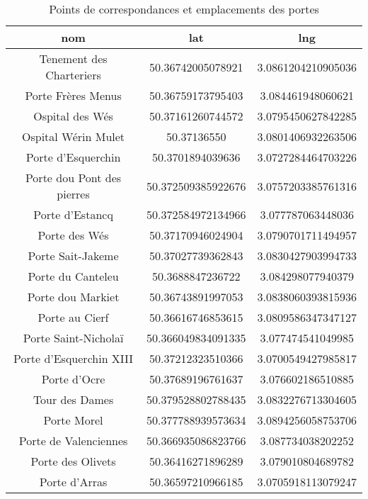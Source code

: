 \small
\begin{table}
    \centering
    \begin{tabular}{|c|c|c|}
\hline	\textbf{nom}	&	\textbf{lat}	&	\textbf{lng}	\\
\hline
\hline	Tenement des Charteriers 	&	50.36742005078921	&	3.0861204210905036	\\
\hline	Porte Frères Menus 	&	50.36759173795403	&	3.084461948060621	\\
\hline	Ospital des Wés 	&	50.37161260744572	&	3.0795450627842285	\\
\hline	Ospital Wérin Mulet 	&	50.37136550	&	3.0801406932263506	\\
\hline	Porte d'Esquerchin	&	50.3701894039636	&	3.0727284464703226	\\
\hline	Porte dou Pont des pierres	&	50.372509385922676	&	3.0757203385761316	\\
\hline	Porte d'Estancq	&	50.372584972134966	&	3.077787063448036	\\
\hline	Porte des Wés	&	50.37170946024904	&	3.0790701711494957	\\
\hline	Porte Sait-Jakeme	&	50.37027739362843	&	3.0830427903994733	\\
\hline	Porte du Canteleu	&	50.3688847236722	&	3.084298077940379	\\
\hline	Porte dou Markiet	&	50.36743891997053	&	3.0838060393815936	\\
\hline	Porte au Cierf	&	50.36616746853615	&	3.0809586347347127	\\
\hline	Porte Saint-Nicholaï	&	50.366049834091335	&	3.077474541049985	\\
\hline	Porte d'Esquerchin XIII	&	50.37212323510366	&	3.0700549427985817	\\
\hline	Porte d'Ocre	&	50.37689196761637	&	3.076602186510885	\\
\hline	Tour des Dames	&	50.379528802788435	&	3.0832276713304605	\\
\hline	Porte Morel	&	50.377788939573634	&	3.0894256058753706	\\
\hline	Porte de Valenciennes	&	50.366935086823766	&	3.087734038202252	\\
\hline	Porte des Olivets	&	50.36416271896289	&	3.079010804689782	\\
\hline	Porte d'Arras	&	50.36597210966185	&	3.0705918113079247	\\
\hline						
    \end{tabular}
    \caption{Points de correspondances et emplacements des portes}
    \label{tab:point_de_repères}
\end{table}
\normalsize